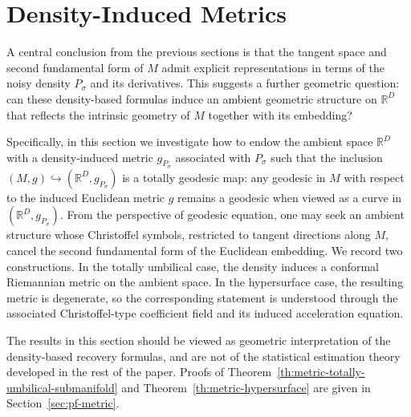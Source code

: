 \documentclass[11pt]{article}
\theoremstyle{plain}
\theoremstyle{definition}
\begin{document}
\section{Density-Induced Metrics}\label{sec:metric-change}
A central conclusion from the previous sections is that the tangent space and second fundamental form of $M$ admit explicit representations in terms of the noisy density $P_\sigma$ and its derivatives. 
This suggests a further geometric question: can these density-based formulas induce an ambient geometric structure on $\mathbb R^D$ that reflects the intrinsic geometry of $M$ together with its embedding?

Specifically, in this section we investigate how to endow the ambient space $\mathbb R^D$ with a density-induced metric $g_{P_\sigma}$ associated with $P_\sigma$ such that the inclusion $(M,g)\hookrightarrow (\mathbb{R}^D, g_{P_\sigma})$ is a totally geodesic map: any geodesic in $M$ with respect to the induced Euclidean metric $g$ remains a geodesic when viewed as a curve in $(\mathbb{R}^D,g_{P_\sigma})$.
From the perspective of geodesic equation, one may seek an ambient structure whose Christoffel symbols, restricted to tangent directions along $M$, cancel the second fundamental form of the Euclidean embedding. 
We record two constructions. In the totally umbilical case, the density induces a conformal Riemannian metric on the ambient space. In the hypersurface case, the resulting metric is degenerate, so the corresponding statement is understood through the associated Christoffel-type coefficient field and its induced acceleration equation.

The results in this section should be viewed as geometric interpretation of the density-based recovery formulas, and are not of the statistical estimation theory developed in the rest of the paper. 
Proofs of Theorem~\ref{th:metric-totally-umbilical-submanifold} and Theorem~\ref{th:metric-hypersurface} are given in Section~\ref{sec:pf-metric}.
 
\end{document}
